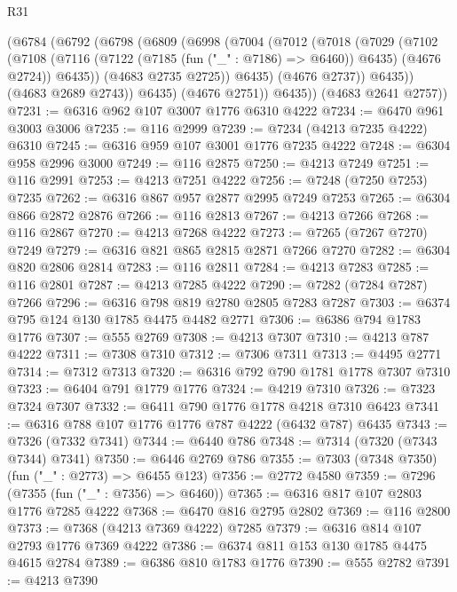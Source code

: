 \begin{lexlean}{R31}
\begin{coremodule}
        (@6784
          (@6792
            (@6798
              (@6809
                (@6998
                  (@7004
                    (@7012
                      (@7018
                        (@7029
                          (@7102
                            (@7108
                              (@7116
                                (@7122 (@7185 (fun ("_" : @7186) => @6460)) @6435)
                                (@4676 @2724))
                              @6435))
                          (@4683 @2735 @2725))
                        @6435)
                      (@4676 @2737))
                    @6435))
                (@4683 @2689 @2743))
              @6435)
            (@4676 @2751))
          @6435))
      (@4683 @2641 @2757))
@7231 := @6316 @962 @107 @3007 @1776 @6310 @4222
@7234 := @6470 @961 @3003 @3006
@7235 := @116 @2999
@7239 := @7234 (@4213 @7235 @4222) @6310
@7245 := @6316 @959 @107 @3001 @1776 @7235 @4222
@7248 := @6304 @958 @2996 @3000
@7249 := @116 @2875
@7250 := @4213 @7249
@7251 := @116 @2991
@7253 := @4213 @7251 @4222
@7256 := @7248 (@7250 @7253) @7235
@7262 := @6316 @867 @957 @2877 @2995 @7249 @7253
@7265 := @6304 @866 @2872 @2876
@7266 := @116 @2813
@7267 := @4213 @7266
@7268 := @116 @2867
@7270 := @4213 @7268 @4222
@7273 := @7265 (@7267 @7270) @7249
@7279 := @6316 @821 @865 @2815 @2871 @7266 @7270
@7282 := @6304 @820 @2806 @2814
@7283 := @116 @2811
@7284 := @4213 @7283
@7285 := @116 @2801
@7287 := @4213 @7285 @4222
@7290 := @7282 (@7284 @7287) @7266
@7296 := @6316 @798 @819 @2780 @2805 @7283 @7287
@7303 := @6374 @795 @124 @130 @1785 @4475 @4482 @2771
@7306 := @6386 @794 @1783 @1776
@7307 := @555 @2769
@7308 := @4213 @7307
@7310 := @4213 @787 @4222
@7311 := @7308 @7310
@7312 := @7306 @7311
@7313 := @4495 @2771
@7314 := @7312 @7313
@7320 := @6316 @792 @790 @1781 @1778 @7307 @7310
@7323 := @6404 @791 @1779 @1776
@7324 := @4219 @7310
@7326 := @7323 @7324 @7307
@7332 := @6411 @790 @1776 @1778 @4218 @7310 @6423
@7341 := @6316 @788 @107 @1776 @1776 @787 @4222 (@6432 @787) @6435
@7343 := @7326 (@7332 @7341)
@7344 := @6440 @786
@7348 := @7314 (@7320 (@7343 @7344) @7341)
@7350 := @6446 @2769 @786
@7355 := @7303 (@7348 @7350) (fun ("_" : @2773) => @6455 @123)
@7356 := @2772 @4580
@7359 := @7296 (@7355 (fun ("_" : @7356) => @6460))
@7365 := @6316 @817 @107 @2803 @1776 @7285 @4222
@7368 := @6470 @816 @2795 @2802
@7369 := @116 @2800
@7373 := @7368 (@4213 @7369 @4222) @7285
@7379 := @6316 @814 @107 @2793 @1776 @7369 @4222
@7386 := @6374 @811 @153 @130 @1785 @4475 @4615 @2784
@7389 := @6386 @810 @1783 @1776
@7390 := @555 @2782
@7391 := @4213 @7390

\end{coremodule}
\end{lexlean}

